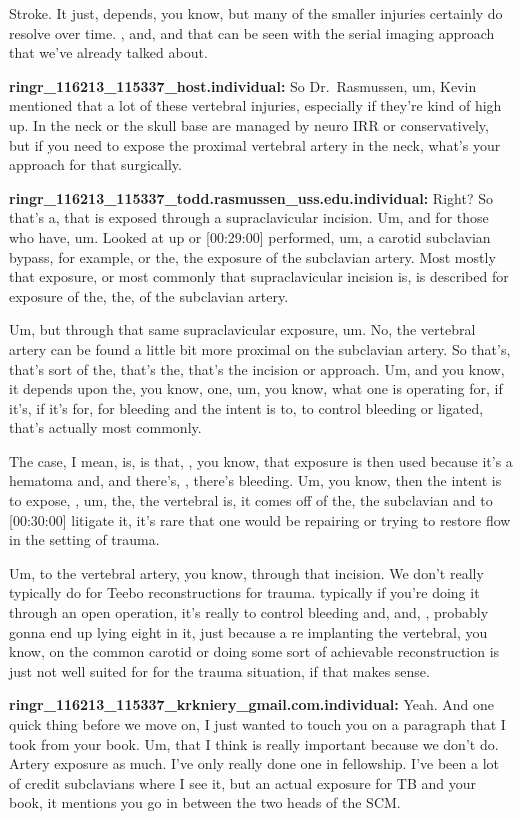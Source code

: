 \documentclass[
]{book}
\begin{document}
Stroke. It just, depends, you know, but many of the smaller injuries
certainly do resolve over time. , and, and that can be seen with the
serial imaging approach that we've already talked about.

\textbf{ringr\_116213\_115337\_host.individual:} So Dr.~Rasmussen, um, Kevin
mentioned that a lot of these vertebral injuries, especially if they're
kind of high up. In the neck or the skull base are managed by neuro IRR
or conservatively, but if you need to expose the proximal vertebral
artery in the neck, what's your approach for that surgically.

\textbf{ringr\_116213\_115337\_todd.rasmussen\_uss.edu.individual:} Right? So
that's a, that is exposed through a supraclavicular incision. Um, and
for those who have, um. Looked at up or {[}00:29:00{]} performed, um, a
carotid subclavian bypass, for example, or the, the exposure of the
subclavian artery. Most mostly that exposure, or most commonly that
supraclavicular incision is, is described for exposure of the, the, of
the subclavian artery.

Um, but through that same supraclavicular exposure, um. No, the
vertebral artery can be found a little bit more proximal on the
subclavian artery. So that's, that's sort of the, that's the, that's the
incision or approach. Um, and you know, it depends upon the, you know,
one, um, you know, what one is operating for, if it's, if it's for, for
bleeding and the intent is to, to control bleeding or ligated, that's
actually most commonly.

The case, I mean, is, is that, , you know, that exposure is then used
because it's a hematoma and, and there's, , there's bleeding. Um, you
know, then the intent is to expose, , um, the, the vertebral is, it
comes off of the, the subclavian and to {[}00:30:00{]} litigate it, it's
rare that one would be repairing or trying to restore flow in the
setting of trauma.

Um, to the vertebral artery, you know, through that incision. We don't
really typically do for Teebo reconstructions for trauma. typically if
you're doing it through an open operation, it's really to control
bleeding and, and, , probably gonna end up lying eight in it, just
because a re implanting the vertebral, you know, on the common carotid
or doing some sort of achievable reconstruction is just not well suited
for for the trauma situation, if that makes sense.

\textbf{ringr\_116213\_115337\_krkniery\_gmail.com.individual:} Yeah. And one
quick thing before we move on, I just wanted to touch you on a paragraph
that I took from your book. Um, that I think is really important because
we don't do. Artery exposure as much. I've only really done one in
fellowship. I've been a lot of credit subclavians where I see it, but an
actual exposure for TB and your book, it mentions you go in between the
two heads of the SCM.
\end{document}
